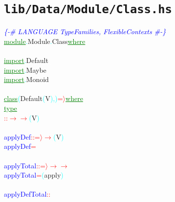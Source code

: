 \section{\texttt{lib/Data/Module/Class.hs}}
\label{mod:Data.Module.Class}
\textcolor{blue}{{\it{}\{-\# LANGUAGE TypeFamilies, FlexibleContexts \#-\}}}\\\textcolor{green}{\underline{module}}\textcolor{cyan}{.}{\rm{}Module}\textcolor{cyan}{.}{\rm{}Class}\hsspace \textcolor{green}{\underline{where}}\\\\\textcolor{green}{\underline{import}}\textcolor{cyan}{.}{\rm{}Default}\\\textcolor{green}{\underline{import}}\textcolor{cyan}{.}{\rm{}Maybe}\\\textcolor{green}{\underline{import}}\textcolor{cyan}{.}{\rm{}Monoid}\\\\\textcolor{green}{\underline{class}}\hsspace \textcolor{cyan}{(}{\rm{}Default}\hsspace \textcolor{cyan}{(}{\rm{}V}\textcolor{cyan}{)}\textcolor{cyan}{,}\textcolor{cyan}{)}\hsspace \textcolor{red}{=\ensuremath{\rangle}}\hsspace \textcolor{green}{\underline{where}}\\\hstab \textcolor{green}{\underline{type}}\\\hsspace \textcolor{red}{::}\hsspace \textcolor{red}{\ensuremath{\rightarrow}}\hsspace \textcolor{red}{\ensuremath{\rightarrow}}\hsspace \textcolor{cyan}{(}{\rm{}V}\textcolor{cyan}{)}\\\\\textcolor{blue}{applyDef}\hsspace \textcolor{red}{::}\hsspace \textcolor{red}{=\ensuremath{\rangle}}\hsspace \textcolor{red}{\ensuremath{\rightarrow}}\hsspace \textcolor{cyan}{(}{\rm{}V}\textcolor{cyan}{)}\\\textcolor{blue}{applyDef}\hsspace \textcolor{red}{=}\\\\\textcolor{blue}{applyTotal}\hsspace \textcolor{red}{::}\hsspace \textcolor{red}{=\ensuremath{\rangle}}\hsspace \textcolor{red}{\ensuremath{\rightarrow}}\hsspace \textcolor{red}{\ensuremath{\rightarrow}}\\\textcolor{blue}{applyTotal}\hsspace \textcolor{red}{=}\hsspace \textcolor{cyan}{(}{\rm{}apply}\textcolor{cyan}{)}\\\\\textcolor{blue}{applyDefTotal}\hsspace \textcolor{red}{::}\hsspace 